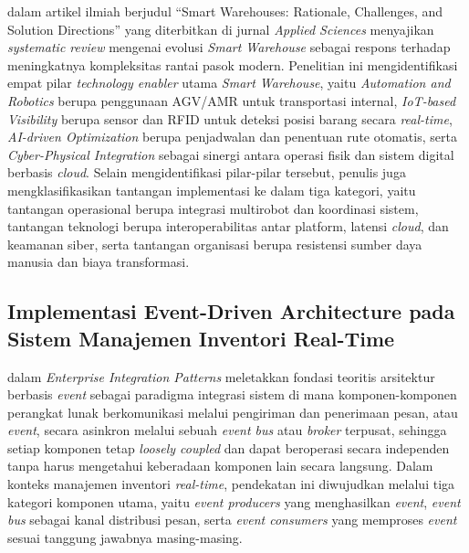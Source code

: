 \textcite{vangeest2021} dalam artikel ilmiah berjudul ``Smart Warehouses: Rationale, Challenges, and Solution Directions'' yang diterbitkan di jurnal \textit{Applied Sciences} menyajikan \textit{systematic review} mengenai evolusi \textit{Smart Warehouse} sebagai respons terhadap meningkatnya kompleksitas rantai pasok modern. Penelitian ini mengidentifikasi empat pilar \textit{technology enabler} utama \textit{Smart Warehouse}, yaitu \textit{Automation and Robotics} berupa penggunaan AGV/AMR untuk transportasi internal, \textit{IoT-based Visibility} berupa sensor dan RFID untuk deteksi posisi barang secara \textit{real-time}, \textit{AI-driven Optimization} berupa penjadwalan dan penentuan rute otomatis, serta \textit{Cyber-Physical Integration} sebagai sinergi antara operasi fisik dan sistem digital berbasis \textit{cloud}. Selain mengidentifikasi pilar-pilar tersebut, penulis juga mengklasifikasikan tantangan implementasi ke dalam tiga kategori, yaitu tantangan operasional berupa integrasi multirobot dan koordinasi sistem, tantangan teknologi berupa interoperabilitas antar platform, latensi \textit{cloud}, dan keamanan siber, serta tantangan organisasi berupa resistensi sumber daya manusia dan biaya transformasi.

\subsection{Implementasi Event-Driven Architecture pada Sistem Manajemen Inventori Real-Time}

\textcite{hohpe2003} dalam \textit{Enterprise Integration Patterns} meletakkan fondasi teoritis arsitektur berbasis \textit{event} sebagai paradigma integrasi sistem di mana komponen-komponen perangkat lunak berkomunikasi melalui pengiriman dan penerimaan pesan, atau \textit{event}, secara asinkron melalui sebuah \textit{event bus} atau \textit{broker} terpusat, sehingga setiap komponen tetap \textit{loosely coupled} dan dapat beroperasi secara independen tanpa harus mengetahui keberadaan komponen lain secara langsung. Dalam konteks manajemen inventori \textit{real-time}, pendekatan ini diwujudkan melalui tiga kategori komponen utama, yaitu \textit{event producers} yang menghasilkan \textit{event}, \textit{event bus} sebagai kanal distribusi pesan, serta \textit{event consumers} yang memproses \textit{event} sesuai tanggung jawabnya masing-masing.

